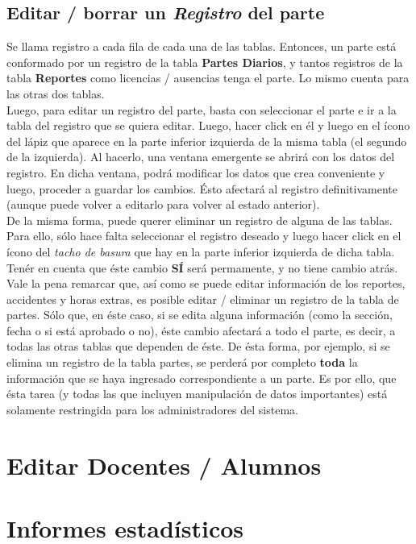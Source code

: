 \documentclass[12pt,a4paper]{article}
\begin{document}
\subsection{Editar / borrar un \textit{Registro} del parte}
Se llama registro a cada fila de cada una de las tablas. Entonces, un parte está conformado por un registro de la tabla \textbf{Partes Diarios}, y tantos registros de la tabla \textbf{Reportes} como licencias / ausencias tenga el parte. Lo mismo cuenta para las otras dos tablas.\\
Luego, para editar un registro del parte, basta con seleccionar el parte e ir a la tabla del registro que se quiera editar. Luego, hacer click en él y luego en el ícono del lápiz que aparece en la parte inferior izquierda de la misma tabla (el segundo de la izquierda). Al hacerlo, una ventana emergente se abrirá con los datos del registro. En dicha ventana, podrá modificar los datos que crea conveniente y luego, proceder a guardar los cambios. Ésto afectará al registro definitivamente (aunque puede volver a editarlo para volver al estado anterior). \\
De la misma forma, puede querer eliminar un registro de alguna de las tablas. Para ello, sólo hace falta seleccionar el registro deseado y luego hacer click en el ícono del \textit{tacho de basura} que hay en la parte inferior izquierda de dicha tabla. Tenér en cuenta que éste cambio \textbf{SÍ} será permamente, y no tiene cambio atrás. \\
Vale la pena remarcar que, así como se puede editar información de los reportes, accidentes y horas extras, es posible editar / eliminar un registro de la tabla de partes. Sólo que, en éste caso, si se edita alguna información (como la sección, fecha o si está aprobado o no), éste cambio afectará a todo el parte, es decir, a todas las otras tablas que dependen de éste. De ésta forma, por ejemplo, si se elimina un registro de la tabla partes, se perderá por completo \textbf{toda} la información que se haya ingresado correspondiente a un parte. Es por ello, que ésta tarea (y todas las que incluyen manipulación de datos importantes) está solamente restringida para los administradores del sistema.

\section{Editar Docentes / Alumnos}

\section{Informes estadísticos}
\end{document}
